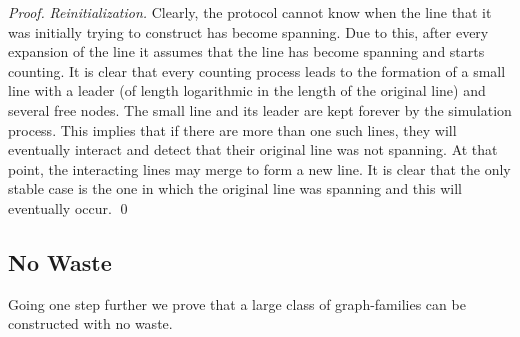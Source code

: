 \documentclass[oribibl, 11pt]{llncs}
\begin{document}
\begin{proof}
\vspace{-3pt}
\noindent\emph{Reinitialization.} Clearly, the protocol cannot know when the line that it was initially trying to construct has become spanning. Due to this, after every expansion of the line it assumes that the line has become spanning and starts counting. It is clear that every counting process leads to the formation of a small line with a leader (of length logarithmic in the length of the original line) and several free nodes. The small line and its leader are kept forever by the simulation process. This implies that if there are more than one such lines, they will eventually interact and detect that their original line was not spanning. At that point, the interacting lines may merge to form a new line. It is clear that the only stable case is the one in which the original line was spanning and this will eventually occur. 
\qed
\end{proof}

\subsection{No Waste}

Going one step further we prove that a large class of graph-families can be constructed with no waste.
\end{document}
